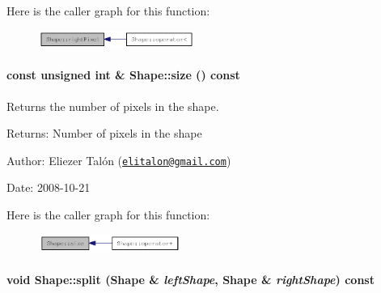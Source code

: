 Here is the caller graph for this function:\nopagebreak
\begin{figure}[H]
\begin{center}
\leavevmode
\includegraphics[width=144pt]{class_shape_c265e43fa90ee2ab7c9cd3a3d1e96d82_icgraph}
\end{center}
\end{figure}
\hypertarget{class_shape_8504d3be338d2fa594c35fe1444a9ed8}{
\paragraph[{size}]{\setlength{\rightskip}{0pt plus 5cm}const unsigned int \& Shape::size () const}\hfill}
\label{class_shape_8504d3be338d2fa594c35fe1444a9ed8}


Returns the number of pixels in the shape. 

\begin{Desc}
\item[Returns:]Number of pixels in the shape\end{Desc}
\begin{Desc}
\item[Author:]Eliezer Talón (\href{mailto:elitalon@gmail.com}{\tt elitalon@gmail.com}) \end{Desc}
\begin{Desc}
\item[Date:]2008-10-21 \end{Desc}


Here is the caller graph for this function:\nopagebreak
\begin{figure}[H]
\begin{center}
\leavevmode
\includegraphics[width=131pt]{class_shape_8504d3be338d2fa594c35fe1444a9ed8_icgraph}
\end{center}
\end{figure}
\hypertarget{class_shape_bcb7d1626e403703952967533c9004ce}{
\paragraph[{split}]{\setlength{\rightskip}{0pt plus 5cm}void Shape::split ({\bf Shape} \& {\em leftShape}, \/  {\bf Shape} \& {\em rightShape}) const}\hfill}
\label{class_shape_bcb7d1626e403703952967533c9004ce}


